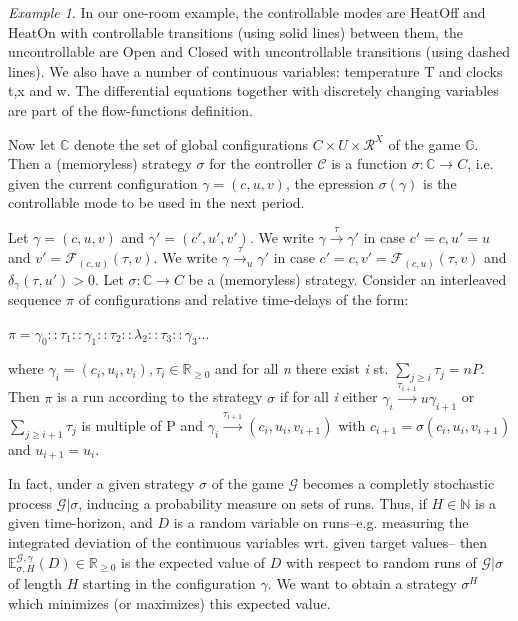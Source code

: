   

    \emph{Example 1}. In our one-room example, the controllable modes are {\color{RawSienna} HeatOff}
    and {\color{RawSienna} HeatOn} with controllable transitions (using solid lines) between
    them, the uncontrollable are {\color{RawSienna} Open} and {\color{RawSienna} Closed} with
    uncontrollable transitions (using dashed lines). We also have a number of continuous 
    variables: temperature T and clocks t,x and w. The differential equations together with
    discretely changing variables are part of the flow-functions definition.

    Now let $\mathbb{C}$ denote the set of global configurations $C\times U \times \mathcal{R}^X$
    of the game $\mathbb{G}$. Then a (memoryless) strategy $\sigma$ for the controller $\mathcal{C}$
    is a function $\sigma: \mathbb{C} \rightarrow C$, i.e. given the current
    configuration $\gamma = (c,u,v)$, the epression $\sigma(\gamma)$ is the controllable mode
    to be used in the next period.

    Let $\gamma = (c,u,v)$ and $\gamma' = (c',u',v')$. We write $\gamma \xrightarrow{\tau} \gamma'$ 
    in case $c'=c, u'=u$ and $v'=\mathcal{F}_{(c,u)}(\tau,v)$. We 
    write $\gamma \xrightarrow{\tau}_{u} \gamma'$ in case $c'=c, v'=\mathcal{F}_{(c,u)}(\tau,v)$
    and $\delta_{\gamma}(\tau,u') > 0$. Let $\sigma: \mathbb{C} \rightarrow C$
    be a (memoryless) strategy. Consider an interleaved sequence $\pi$ of configurations and
    relative time-delays of the form:
    
    \begin{center}
      $\pi = \gamma_0 :: \tau_1 :: \gamma_1 :: \tau_2 :: \lambda_2 :: \tau_3 :: \gamma_3 ...$  
    \end{center}

    where $\gamma_i = (c_i,u_i,v_i), \tau_i \in \mathbb{R}_{\geqslant 0}$ and for all \emph{n} 
    there  exist \emph{i} st. $\sum_{j \geqslant i}\tau_j = nP$. Then $\pi$ is a run according
    to the strategy $\sigma$ if for all \emph{i} either $\gamma_i \xrightarrow{\tau_{i+1}}u \gamma_{i+1}$
    or $\sum_{j \geqslant i+1}\tau_j$ is multiple of P and $\gamma_i \xrightarrow{\tau_{i+1}} (c_i,u_i,v_{i+1})$
    with $c_{i+1} = \sigma(c_i,u_i,v_{i+1})$ and $u_{i+1}=u_i$.

    In fact, under a given strategy $\sigma$ of the game $\mathcal{G}$ becomes a completly 
    stochastic process $\mathcal{G}|\sigma$, inducing a probability measure on sets of runs.
    Thus, if $H \in \mathbb{N}$ is a given time-horizon, and $D$ is a random variable on runs--e.g.
    measuring the integrated deviation of the continuous variables wrt. given target values--
    then $\mathbb{E}^{\mathcal{G,\gamma}}_{\sigma,H}(D) \in \mathbb{R}_{\geqslant 0}$ is 
    the expected value of $D$ with respect to random runs of $\mathcal{G}|\sigma$ of length
    $H$ starting in the configuration $\gamma$. We want to obtain a strategy $\sigma^H$ which
    minimizes (or maximizes) this expected value.


